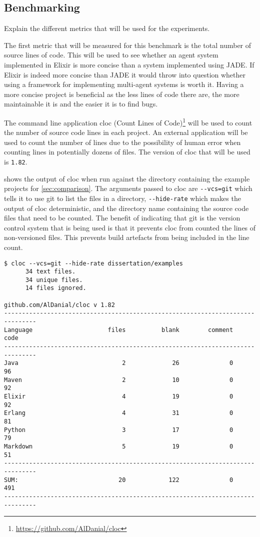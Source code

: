 \subsection{Benchmarking}

Explain the different metrics that will be used for the experiments.

The first metric that will be measured for this benchmark is the total number of source lines of code.
This will be used to see whether an agent system implemented in Elixir is more concise than a system implemented using JADE\@.
If Elixir is indeed more concise than JADE it would throw into question whether using a framework for implementing multi-agent systems is worth it.
Having a more concise project is beneficial as the less lines of code there are, the more maintainable it is and the easier it is to find bugs.

The command line application cloc (Count Lines of Code)\footnote{\url{https://github.com/AlDanial/cloc}} will be used to count the number of source code lines in each project.
An external application will be used to count the number of lines due to the possibility of human error when counting lines in potentially dozens of files.
The version of cloc that will be used is \verb|1.82|.

 shows the output of cloc when run against the directory containing the example projects for \cref{sec:comparison}.
The arguments passed to cloc are \verb|--vcs=git| which tells it to use git to list the files in a directory, \verb|--hide-rate| which makes the output of cloc deterministic, and the directory name containing the source code files that need to be counted.
The benefit of indicating that git is the version control system that is being used is that it prevents cloc from counted the lines of non-versioned files.
This prevents build artefacts from being included in the line count.

\begin{lstlisting}[numbers=none,float=ht,label=lst:cloc,caption=Output of cloc when run on the example projects]
$ cloc --vcs=git --hide-rate dissertation/examples
      34 text files.
      34 unique files.
      14 files ignored.

github.com/AlDanial/cloc v 1.82
-------------------------------------------------------------------------------
Language                     files          blank        comment           code
-------------------------------------------------------------------------------
Java                             2             26              0             96
Maven                            2             10              0             92
Elixir                           4             19              0             92
Erlang                           4             31              0             81
Python                           3             17              0             79
Markdown                         5             19              0             51
-------------------------------------------------------------------------------
SUM:                            20            122              0            491
-------------------------------------------------------------------------------
\end{lstlisting}

